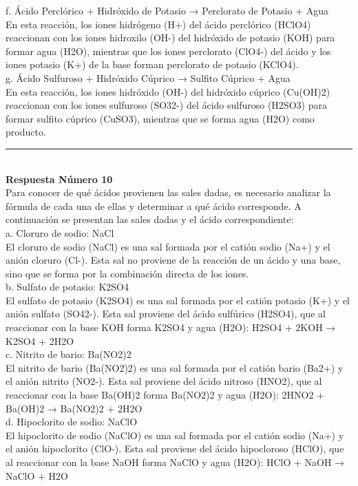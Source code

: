 \documentclass{article}
\begin{document}
f. Ácido Perclórico + Hidróxido de Potasio → Perclorato de Potasio + Agua\\
En esta reacción, los iones hidrógeno (H+) del ácido perclórico (HClO4) reaccionan con los iones hidroxilo (OH-) del hidróxido de potasio (KOH) para formar agua (H2O), mientras que los iones perclorato (ClO4-) del ácido y los iones potasio (K+) de la base forman perclorato de potasio (KClO4).\\
g. Ácido Sulfuroso + Hidróxido Cúprico → Sulfito Cúprico + Agua\\
En esta reacción, los iones hidróxido (OH-) del hidróxido cúprico (Cu(OH)2) reaccionan con los iones sulfuroso (SO32-) del ácido sulfuroso (H2SO3) para formar sulfito cúprico (CuSO3), mientras que se forma agua (H2O) como producto.\\
\noindent\rule{\textwidth}{1pt} \\
\textbf{Respuesta Número 10} \\
Para conocer de qué ácidos provienen las sales dadas, es necesario analizar la fórmula de cada una de ellas y determinar a qué ácido corresponde. A continuación se presentan las sales dadas y el ácido correspondiente:\\
a. Cloruro de sodio: NaCl\\
El cloruro de sodio (NaCl) es una sal formada por el catión sodio (Na+) y el anión cloruro (Cl-). Esta sal no proviene de la reacción de un ácido y una base, sino que se forma por la combinación directa de los iones. \\
b. Sulfato de potasio: K2SO4\\
El sulfato de potasio (K2SO4) es una sal formada por el catión potasio (K+) y el anión sulfato (SO42-). Esta sal proviene del ácido sulfúrico (H2SO4), que al reaccionar con la base KOH forma K2SO4 y agua (H2O): H2SO4 + 2KOH → K2SO4 + 2H2O\\
c. Nitrito de bario: Ba(NO2)2\\
El nitrito de bario (Ba(NO2)2) es una sal formada por el catión bario (Ba2+) y el anión nitrito (NO2-). Esta sal proviene del ácido nitroso (HNO2), que al reaccionar con la base Ba(OH)2 forma Ba(NO2)2 y agua (H2O): 2HNO2 + Ba(OH)2 → Ba(NO2)2 + 2H2O\\
d. Hipoclorito de sodio: NaClO\\
El hipoclorito de sodio (NaClO) es una sal formada por el catión sodio (Na+) y el anión hipoclorito (ClO-). Esta sal proviene del ácido hipocloroso (HClO), que al reaccionar con la base NaOH forma NaClO y agua (H2O): HClO + NaOH → NaClO + H2O\\
\end{document}
